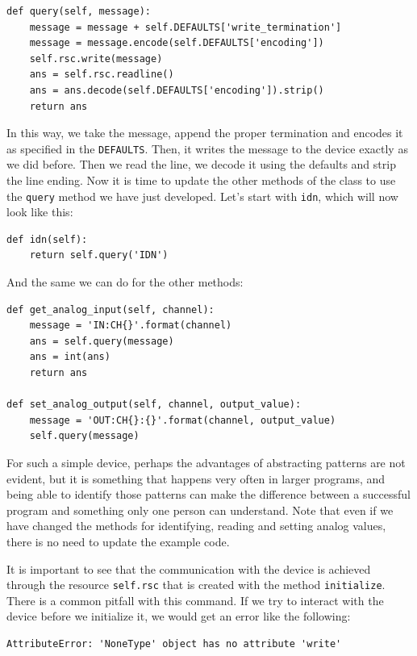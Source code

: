\begin{verbatim}
def query(self, message):
    message = message + self.DEFAULTS['write_termination']
    message = message.encode(self.DEFAULTS['encoding'])
    self.rsc.write(message)
    ans = self.rsc.readline()
    ans = ans.decode(self.DEFAULTS['encoding']).strip()
    return ans
\end{verbatim}

In this way, we take the message, append the proper termination and encodes it as specified in the \texttt{DEFAULTS}. Then, it writes the message to the
device exactly as we did before. Then we read the line, we decode it using the defaults and strip the line ending. Now it is time to update the other methods of the class to use the \texttt{query} method we have just developed. Let's start with \texttt{idn}, which will now look like this:

\begin{verbatim}
def idn(self):
    return self.query('IDN')
\end{verbatim}

And the same we can do for the other methods:

\begin{verbatim}
def get_analog_input(self, channel):
    message = 'IN:CH{}'.format(channel)
    ans = self.query(message)
    ans = int(ans)
    return ans

def set_analog_output(self, channel, output_value):
    message = 'OUT:CH{}:{}'.format(channel, output_value)
    self.query(message)
\end{verbatim}

For such a simple device, perhaps the advantages of abstracting patterns are not evident, but it is something that happens very often in larger programs, and being able to identify those patterns can make the difference between a successful program and something only one person can understand. Note that even if we have changed the methods for identifying, reading and setting analog values, there is no need to update the example code.

It is important to see that the communication with the device is achieved through the resource \texttt{self.rsc} that is created with the method \texttt{initialize}. There is a common pitfall with this command. If we try to interact with the device before we initialize it, we would get an error like the following:

\begin{verbatim}
AttributeError: 'NoneType' object has no attribute 'write'
\end{verbatim}

